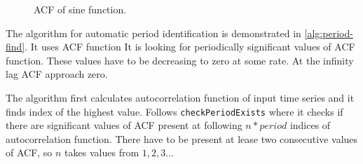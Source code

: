     \begin{figure}[H]
        \begin{center}
            \caption{ACF of sine function.}
            \label{img:period-acf}
        \end{center}
    \end{figure}

    The algorithm for automatic period identification is demonstrated in \ref{alg:period-find}. It uses ACF function
    It is looking for periodically significant values of ACF function. These values have to be decreasing to zero at
    some rate. At the infinity lag ACF approach zero.

    The algorithm first calculates autocorrelation function of input time series and it finds index of the highest
    value. Follows \texttt{checkPeriodExists} where it checks if there are significant values of ACF present at following $n*period$
    indices of autocorrelation function. There have to be present at lease two consecutive values of ACF, so $n$ takes
    values from $1,2,3\dots$

